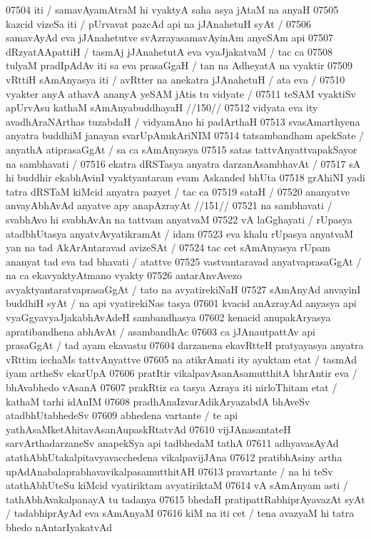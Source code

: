 07504 iti / samavAyamAtraM hi vyaktyA saha asya jAtaM na anyaH 
07505 kazcid vizeSa iti / pUrvavat pazcAd api na jJAnahetuH syAt /
07506 samavAyAd eva jJAnahetutve svAzrayasamavAyinAm anyeSAm api 
07507 dRzyatAApattiH / tasmAj jJAnahetutA eva vyaJjakatvaM / tac ca
07508 tulyaM pradIpAdAv iti sa eva prasaGgaH / tan na AdheyatA na vyaktir
07509 vRttiH sAmAnyasya iti / avRtter na anekatra jJAnahetuH / ata eva / 
07510 	vyakter anyA athavA ananyA yeSAM jAtis tu vidyate / 
07511 	teSAM vyaktiSv apUrvAsu kathaM sAmAnyabuddhayaH //150//  
07512 vidyata eva ity avadhAraNArthas tuzabdaH / vidyamAno hi padArthaH
07513 svasAmarthyena anyatra buddhiM janayan svarUpAnukAriNIM
07514 tatsambandham apekSate / anyathA atiprasaGgAt / sa ca sAmAnyasya  
07515 satas tattvAnyattvapakSayor na sambhavati /  
07516 	ekatra dRSTasya anyatra darzanAsambhavAt /  
07517 sA hi buddhir ekabhAvinI vyaktyantaram evam Askanded bhUta  
07518 grAhiNI yadi tatra dRSTaM kiMcid anyatra pazyet / tac ca 
07519 	sataH /  
07520 	ananyatve anvayAbhAvAd anyatve apy anapAzrayAt //151//
07521 na sambhavati / svabhAvo hi svabhAvAn na tattvam anyatvaM  
07522 vA laGghayati / rUpasya atadbhUtasya anyatvAvyatikramAt / idam
07523 eva khalu rUpasya anyatvaM yan na tad AkArAntaravad avizeSAt /  
07524 tac cet sAmAnyasya rUpam ananyat tad eva tad bhavati / atattve
07525 vastvantaravad anyatvaprasaGgAt / na ca ekavyaktyAtmano  vyakty
07526 antarAnvAvezo avyaktyantaratvaprasaGgAt / tato na avyatirekiNaH 
07527 sAmAnyAd anvayinI buddhiH syAt / na api vyatirekiNas tasya  
07601 kvacid anAzrayAd anyasya api vyaGgyavyaJjakabhAvAdeH sambandhasya
07602 kenacid anupakAryasya apratibandhena abhAvAt / asambandhAc
07603 ca jJAnautpattAv api prasaGgAt / tad ayam ekavastu
07604 darzanena ekavRtteH pratyayasya anyatra vRttim icchaMs tattvAnyattve 
07605 na atikrAmati ity ayuktam etat / tasmAd iyam artheSv ekarUpA
07606 pratItir vikalpavAsanAsamutthitA bhrAntir eva / bhAvabhedo vAsanA
07607 prakRtiz ca tasya Azraya iti nirloThitam etat / kathaM tarhi idAnIM 
07608 pradhAnaIzvarAdikAryazabdA bhAveSv atadbhUtabhedeSv
07609 abhedena vartante / te api yathAsaMketAhitavAsanAupaskRtatvAd
07610 vijJAnasantateH sarvArthadarzaneSv anapekSya api tadbhedaM tathA
07611 adhyavasAyAd atathAbhUtakalpitavyavacchedena vikalpavijJAna
07612 pratibhAsiny artha upAdAnabalaprabhavavikalpasamutthitAH 
07613 pravartante / na hi teSv atathAbhUteSu kiMcid vyatiriktam  avyatiriktaM 
07614 vA sAmAnyam asti / tathAbhAvakalpanayA tu tadanya 
07615 bhedaH pratipattRabhiprAyavazAt syAt / tadabhiprAyAd eva sAmAnyaM
07616 kiM na iti cet / tena avazyaM hi tatra bhedo nAntarIyakatvAd  
